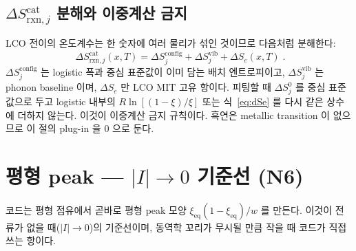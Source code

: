 \documentclass[11pt,a4paper]{article}
\newcommand{\eq}{\mathrm{eq}}
\newcommand{\rxn}{\mathrm{rxn}}
\begin{document}
\subsection{$\Delta S_{\rxn,j}^\mathrm{cat}$ 분해와 이중계산 금지}
LCO 전이의 온도계수는 한 숫자에 여러 물리가 섞인 것이므로 다음처럼 분해한다:
\begin{equation}
\boxed{\;\Delta S_{\rxn,j}^\mathrm{cat}(x,T)
=\Delta S_j^\mathrm{config}
+\Delta S_j^\mathrm{vib}
+\Delta S_e(x,T)\;.}
\label{eq:dScatdecomp}
\end{equation}
$\Delta S_j^\mathrm{config}$ 는 logistic 폭과 중심 표준값이 이미 담는 배치 엔트로피이고,
$\Delta S_j^\mathrm{vib}$ 는 phonon baseline 이며, $\Delta S_e$ 만 LCO MIT 고유 항이다. 피팅할 때
$\Delta S_j^0$ 를 중심 표준값으로 두고 logistic 내부의 $R\ln[(1-\xi)/\xi]$ 또는 식~\eqref{eq:dSe} 를 다시 같은
상수에 더하지 않는다. 이것이 이중계산 금지 규칙이다. 흑연은 metallic transition 이 없으므로 이 절의 plug-in 을
$0$ 으로 둔다.

\section{평형 peak — $|I|\to0$ 기준선 (N6)}\label{sec:eqpeak}
코드는 평형 점유에서 곧바로 평형 peak 모양 $\xi_\eq(1-\xi_\eq)/w$ 를 만든다. 이것이 전류가 없을 때($|I|\to0$)의
기준선이며, 동역학 꼬리가 무시될 만큼 작을 때 코드가 직접 쓰는 항이다.
\end{document}
